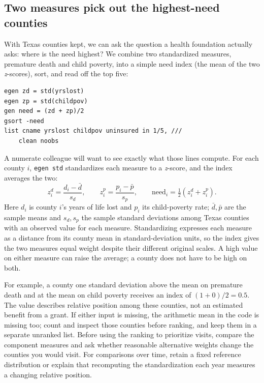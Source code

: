 \subsection{Two measures pick out the highest-need counties}\label{sec:ch04-needindex}
With Texas counties kept, we can ask the question a health foundation actually asks: where is the need highest? We combine two standardized measures, premature death and child poverty, into a simple need index (the mean of the two \emph{z}-scores), sort, and read off the top five:
\par
{\footnotesize
\begin{verbatim}
egen zd = std(yrslost)
egen zp = std(childpov)
gen need = (zd + zp)/2
gsort -need
list cname yrslost childpov uninsured in 1/5, ///
    clean noobs
\end{verbatim}
}
A numerate colleague will want to see exactly what those lines compute. For each county $i$, \texttt{egen std} standardizes each
measure to a \emph{z}-score, and the index averages the two:
\[
z^{d}_i=\frac{d_i-\bar d}{s_d},\qquad
z^{p}_i=\frac{p_i-\bar p}{s_p},\qquad
\text{need}_i=\tfrac{1}{2}\!\left(z^{d}_i+z^{p}_i\right).
\]
Here $d_i$ is county $i$'s years of life lost and $p_i$ its child-poverty
rate; $\bar d,\bar p$ are the sample means and $s_d,s_p$ the sample
standard deviations among Texas counties with an observed value for each measure. Standardizing expresses each measure as a distance from its county mean in standard-deviation units, so the index gives the two measures equal weight despite their different original scales. A high value on either measure can raise the average; a county does not have to be high on both.

For example, a county one standard deviation above the mean on premature death and at the mean on child poverty receives an index of $(1+0)/2=0.5$. The value describes relative position among these counties, not an estimated benefit from a grant. If either input is missing, the arithmetic mean in the code is missing too; count and inspect those counties before ranking, and keep them in a separate unranked list. Before using the ranking to prioritize visits, compare the component measures and ask whether reasonable alternative weights change the counties you would visit. For comparisons over time, retain a fixed reference distribution or explain that recomputing the standardization each year measures a changing relative position.

